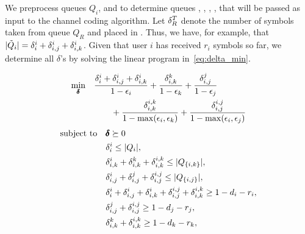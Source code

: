 We preprocess queues $Q_i$,  and  to determine queues , , , ,  that will be passed as input to the channel coding algorithm.  Let $\delta_{R}^{T}$ denote the number of symbols taken from queue $Q_R$ and placed in .  Thus, we have, for example, that $| \tilde{Q}_{i}| = \delta_{i}^{i} + \delta_{i,j}^{i} + \delta_{i,k}^{i}$.  Given that user $i$ has received $r_i$ symbols so far, we determine all $\delta$'s by solving the linear program in~\eqref{eq:delta_min}.
\begin{figure}
\begin{equation}
\label{eq:delta_min}
\begin{aligned}
	& \underset{\pmb{\delta}}{\text{min}}
	&& \frac{\delta_{i}^{i} +  \delta_{i,j}^{i} + \delta_{i,k}^{i}}{1 - \epsilon_i} + \frac{\delta_{i,k}^{k}}{1 - \epsilon_{k}} +  \frac{\delta_{i,j}^{j}}{1 - \epsilon_{j}} \\
	&&& \qquad + \frac{\delta_{i,k}^{i,k}}{1 - \max(\epsilon_i, \epsilon_k)} + \frac{\delta_{i,j}^{i,j}}{1 - \max(\epsilon_i, \epsilon_j)}
\end{aligned}
\end{equation}
\[
\begin{aligned}
	& \text{subject to}
	&& \pmb{\delta} \succeq 0 \\
	&&&  \delta_{i}^{i}  \leq | Q_i |, \\
	&&&  \delta_{i,k}^{i} +  \delta_{i,k}^{k} + \delta_{i,k}^{i,k} \leq | Q_{\{i, k\}} |, \\
	&&&  \delta_{i,j}^{i} +  \delta_{i,j}^{j} + \delta_{i,j}^{i,j} \leq | Q_{\{i, j\}} |, \\
	&&& \delta_{i}^{i} + \delta_{i,j}^{i} + \delta_{i,k}^{i} + \delta_{i, j}^{i, j} + \delta_{i,k}^{i,k} \geq 1 - d_i - r_i, \\
	&&&  \delta_{i,j}^{j} + \delta_{i,j}^{i,j}  \geq 1 - d_j - r_j, \\
	&&&  \delta_{i,k}^{k} + \delta_{i,k}^{i,k}  \geq 1 - d_k - r_k,
\end{aligned}
\]
\end{figure}
